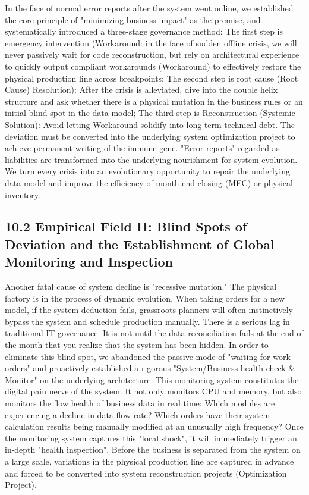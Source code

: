 \documentclass[11pt,a4paper]{article}
\begin{document}
In the face of normal error reports after the system went online, we established the core principle of "minimizing business impact" as the premise, and systematically introduced a three-stage governance method: The first step is emergency intervention (Workaround: in the face of sudden offline crisis, we will never passively wait for code reconstruction, but rely on architectural experience to quickly output compliant workarounds (Workaround) to effectively restore the physical production line across breakpoints; The second step is root cause (Root Cause) Resolution): After the crisis is alleviated, dive into the double helix structure and ask whether there is a physical mutation in the business rules or an initial blind spot in the data model; The third step is Reconstruction (Systemic Solution): Avoid letting Workaround solidify into long-term technical debt. The deviation must be converted into the underlying system optimization project to achieve permanent writing of the immune gene. "Error reports" regarded as liabilities are transformed into the underlying nourishment for system evolution. We turn every crisis into an evolutionary opportunity to repair the underlying data model and improve the efficiency of month-end closing (MEC) or physical inventory.


\subsection*{10.2 Empirical Field II: Blind Spots of Deviation and the Establishment of Global Monitoring and Inspection}


Another fatal cause of system decline is "recessive mutation." The physical factory is in the process of dynamic evolution. When taking orders for a new model, if the system deduction fails, grassroots planners will often instinctively bypass the system and schedule production manually. There is a serious lag in traditional IT governance. It is not until the data reconciliation fails at the end of the month that you realize that the system has been hidden. In order to eliminate this blind spot, we abandoned the passive mode of "waiting for work orders" and proactively established a rigorous "System/Business health check \& Monitor" on the underlying architecture. This monitoring system constitutes the digital pain nerve of the system. It not only monitors CPU and memory, but also monitors the flow health of business data in real time: Which modules are experiencing a decline in data flow rate? Which orders have their system calculation results being manually modified at an unusually high frequency? Once the monitoring system captures this "local shock", it will immediately trigger an in-depth "health inspection". Before the business is separated from the system on a large scale, variations in the physical production line are captured in advance and forced to be converted into system reconstruction projects (Optimization Project).
\end{document}
